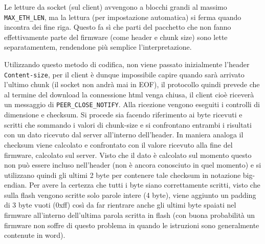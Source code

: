 Le letture da socket (sul client) avvengono a blocchi grandi al massimo \texttt{MAX\_ETH\_LEN}, ma la lettura (per impostazione automatica) si ferma quando incontra dei fine riga. Questo fa s\`i che parti del pacchetto che non fanno effettivamente parte del firmware (come header e chunk size) sono lette separatamentem, rendendone pi\`u semplice l'interpretazione.

Utilizzando questo metodo di codifica, non viene passato inizialmente l'header \texttt{Content-size}, per il client \`e dunque impossibile capire quando sar\`a arrivato l'ultimo chunk (il socket non andr\`a mai in EOF), il protocollo quindi prevede che al termine del download la connessione html venga chiusa, il client cio\`e ricever\`a un messaggio di \texttt{PEER\_CLOSE\_NOTIFY}. Alla ricezione vengono eseguiti i controlli di dimensione e checksum. Si procede sia facendo riferimento ai byte ricevuti e scritti che sommando i valori di chunk-size e si confrontano entrambi i risultati con un dato ricevuto dal server all'interno dell'header. In maniera analoga il checksum viene calcolato e confrontato con il valore ricevuto alla fine del firmware, calcolato sul server. Visto che il dato \`e calcolato sul momento questo non pu\`o essere incluso nell'header (non \`e ancora conosciuto in quel momento) e si utilizzano quindi gli ultimi 2 byte per contenere tale checksum in notazione big-endian. Per avere la certezza che tutti i byte siano correttamente scritti, visto che sulla flash vengono scritte solo parole intere (4 byte), viene aggiunto un padding di 3 byte vuoti (0xff) cos\`i da far rientrare anche gli ultimi byte spaiati nel firmware all'interno dell'ultima parola scritta in flash (con buona probabilit\`a un firmware non soffre di questo problema in quando le istruzioni sono generalmente contenute in word).

